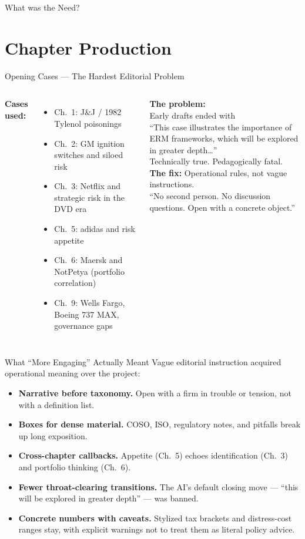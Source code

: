 \documentclass[11pt, aspectratio=169]{beamer}
\begin{document}
\begin{frame}{What was the Need?}
\section{Chapter Production}

\begin{frame}{Opening Cases --- The Hardest Editorial Problem}
\begin{columns}[T]
\textbf{Cases used:}
\begin{itemize}
  \item Ch.\ 1: J\&J / 1982 Tylenol poisonings
  \item Ch.\ 2: GM ignition switches and siloed risk
  \item Ch.\ 3: Netflix and strategic risk in the DVD era
  \item Ch.\ 5: adidas and risk appetite
  \item Ch.\ 6: Maersk and NotPetya (portfolio correlation)
  \item Ch.\ 9: Wells Fargo, Boeing 737 MAX, governance gaps
\end{itemize}
\textbf{The problem:}\\
Early drafts ended with\\
``This case illustrates the importance of ERM frameworks,
which will be explored in greater depth\ldots''\\[6pt]
\alert{Technically true. Pedagogically fatal.}\\[6pt]
\textbf{The fix:} Operational rules, not vague instructions.\\
``No second person. No discussion questions. Open with a concrete object.''
\end{columns}
\end{frame}

\begin{frame}{What ``More Engaging'' Actually Meant}
Vague editorial instruction acquired operational meaning over the project:
\begin{itemize}
  \item \textbf{Narrative before taxonomy.}
        Open with a firm in trouble or tension, not with a definition list.
  \item \textbf{Boxes for dense material.}
        COSO, ISO, regulatory notes, and pitfalls break up long exposition.
  \item \textbf{Cross-chapter callbacks.}
        Appetite (Ch.\ 5) echoes identification (Ch.\ 3) and portfolio thinking (Ch.\ 6).
  \item \textbf{Fewer throat-clearing transitions.}
        The AI's default closing move --- ``this will be explored in greater depth'' ---
        was banned.
  \item \textbf{Concrete numbers with caveats.}
        Stylized tax brackets and distress-cost ranges stay, with explicit warnings
        not to treat them as literal policy advice.
\end{itemize}
\end{frame}


\end{frame}
\end{document}
